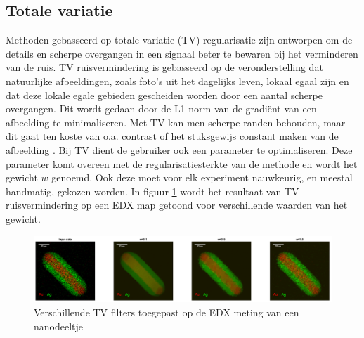 \documentclass{report}
\begin{document}
\subsection{Totale variatie}
Methoden gebasseerd op totale variatie (TV) regularisatie zijn ontworpen om de details en scherpe overgangen in een signaal beter te bewaren bij het verminderen van de ruis. TV ruisvermindering is gebasseerd op de veronderstelling dat natuurlijke afbeeldingen, zoals foto's uit het dagelijks leven, lokaal egaal zijn en dat deze lokale egale gebieden gescheiden worden door een aantal scherpe overgangen. Dit wordt gedaan door de L1 norm van de gradiënt van een afbeelding te minimaliseren. Met TV kan men scherpe randen behouden, maar dit gaat ten koste van o.a. contrast of het stuksgewijs constant maken van de afbeelding \cite{paper:tv}. Bij TV dient de gebruiker ook een parameter te optimaliseren. Deze parameter komt overeen met de regularisatiesterkte van de methode en wordt het gewicht $w$ genoemd. Ook deze moet voor elk experiment nauwkeurig, en meestal handmatig, gekozen worden. In figuur \ref{fig:tem_tv_w} wordt het resultaat van TV ruisvermindering op een EDX map getoond voor verschillende waarden van het gewicht.
\begin{figure}[h!]
	\centering
	\includegraphics[width=15cm]{images/tem/tv_w.png}
	\caption{Verschillende TV filters toegepast op de EDX meting van een nanodeeltje}
	\label{fig:tem_tv_w}
\end{figure}
\end{document}
